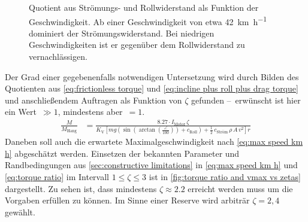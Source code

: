 		\begin{figure}[h]
			\centering
			
			\caption[Quotient aus Strömungs- und Rollwiderstand als Funktion der Geschwindigkeit]{Quotient aus Strömungs- und Rollwiderstand als Funktion der Geschwindigkeit. Ab einer Geschwindigkeit von etwa \qty{42}{\kilo\metre\per\hour} dominiert der Strömungswiderstand. Bei niedrigen Geschwindigkeiten ist er gegenüber dem Rollwiderstand zu vernachlässigen.}%
			\label{fig:Froll vs Fdrag}
		\end{figure}
		Der Grad einer gegebenenfalls notwendigen Untersetzung wird durch Bilden des Quotienten aus \cref{eq:frictionless torque} und \cref{eq:incline plus roll plus drag torque} und anschließendem Auftragen als Funktion von \(\zeta\) gefunden --~erwünscht ist hier ein Wert~\(\gg 1\), mindestens aber~\(= 1\).
		\begin{align}
			\frac{M}{M_\text{Hang}} &= \frac{\num{8,27} \cdot I_\text{Motor} \, \zeta}{K_\text{V}
			\left[ m g
				\left(\sin
					\left(\arctan
						\left(
							\frac{\angle}{100}
						\right)
					\right) + c_\text{Roll}
				\right) + \frac{1}{2} \, c_\text{Ström} \, \rho \, A \, v^2
			\right] r}%
			\label{eq:torque ratio}
		\end{align}
		Daneben soll auch die erwartete Maximalgeschwindigkeit nach \cref{eq:max speed km h} abgeschätzt werden.
		Einsetzen der bekannten Parameter und Randbedingungen aus \cref{sec:constructive limitations} in \cref{eq:max speed km h} und \cref{eq:torque ratio} im Intervall \(1 \leq \zeta \leq 3\) ist in \cref{fig:torque ratio and vmax vs zetas} dargestellt.
		Zu sehen ist, dass mindestens \(\zeta \approx \num{2,2}\) erreicht werden muss um die Vorgaben erfüllen zu können.
		Im Sinne einer Reserve wird arbiträr \(\zeta = 2,4\) gewählt.
